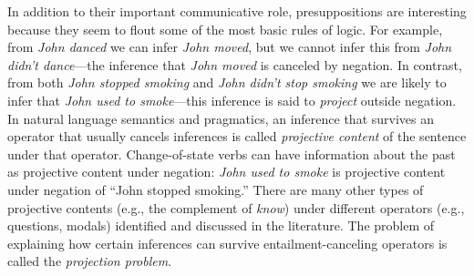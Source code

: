 \documentclass[10pt,letterpaper]{article}
\begin{document}
In addition to their important communicative role, presuppositions are interesting because they seem to flout some of the most basic rules of logic. For example, from \emph{John danced} we can infer \emph{John moved}, but we cannot infer this from \emph{John didn't dance}---the inference that \emph{John moved} is canceled by negation.
In contrast, from both \emph{John stopped smoking} and \emph{John didn't stop smoking} we are likely to infer that \emph{John used to smoke}---this inference is said to \emph{project} outside negation.
In natural language semantics and pragmatics, an inference that survives an operator that usually cancels inferences is called
 \emph{projective content} of the sentence under that operator. 
Change-of-state verbs can have information about the past as projective content under negation: \emph{John used to smoke} is projective content under negation of ``John stopped smoking.'' 
There are many other types of projective contents 
 (e.g., the complement of \emph{know}) under different operators 
 (e.g., questions, modals) identified and discussed in the literature. 
The problem of explaining how certain inferences can
 survive entailment-canceling operators is called the \emph{projection problem}.



\end{document}
